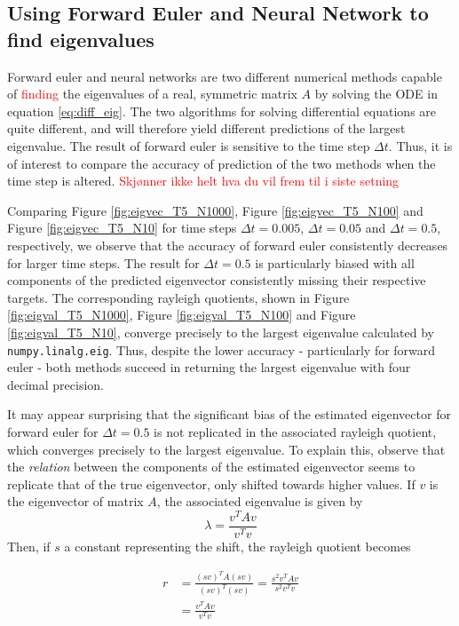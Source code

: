 \documentclass[12pt]{extarticle}
\def\code#1{\texttt{#1}}
\begin{document}
\subsection{Using Forward Euler and Neural Network to find eigenvalues}
Forward euler and neural networks are two different numerical methods capable of \textcolor{red}{finding} the eigenvalues of a real, symmetric matrix $A$ by solving the ODE in equation \eqref{eq:diff_eig}. The two algorithms for solving differential equations are quite different, and will therefore yield different predictions of the largest eigenvalue. The result of forward euler is sensitive to the time step $\Delta t$. Thus, it is of interest to compare the accuracy of prediction of the two methods when the time step is altered. \textcolor{red}{Skjønner ikke helt hva du vil frem til i siste setning}

Comparing Figure \ref{fig:eigvec_T5_N1000}, Figure \ref{fig:eigvec_T5_N100} and Figure \ref{fig:eigvec_T5_N10} for time steps $\Delta t = 0.005$, $\Delta t = 0.05$ and $\Delta t = 0.5$, respectively, we observe that the accuracy of forward euler consistently decreases for larger time steps. The result for $\Delta t=0.5$ is particularly biased with all components of the predicted eigenvector consistently missing their respective targets. The corresponding rayleigh quotients, shown in Figure \ref{fig:eigval_T5_N1000}, Figure \ref{fig:eigval_T5_N100} and Figure \ref{fig:eigval_T5_N10}, converge precisely to the largest eigenvalue calculated by \code{numpy.linalg.eig}. Thus, despite the lower accuracy - particularly for forward euler - both methods succeed in returning the largest eigenvalue with four decimal precision.

It may appear surprising that the significant bias of the estimated eigenvector for forward euler for $\Delta t =0.5$ is not replicated in the associated rayleigh quotient, which converges precisely to the largest eigenvalue. To explain this, observe that the \textit{relation} between the components of the estimated eigenvector seems to replicate that of the true eigenvector, only shifted towards higher values. If $v$ is the eigenvector of matrix $A$, the associated eigenvalue is given by
\[ \lambda = \frac{v^T A v}{v^T v} \]
Then, if $s$ a constant representing the shift, the rayleigh quotient becomes

\begin{align*}
	r &= \frac{(sv)^T A (sv)}{(sv)^T (sv)} = \frac{s^2 v^T A v}{s^2 v^T v} \\
	&= \frac{v^T A v}{v^T v}
\end{align*}
\end{document}
